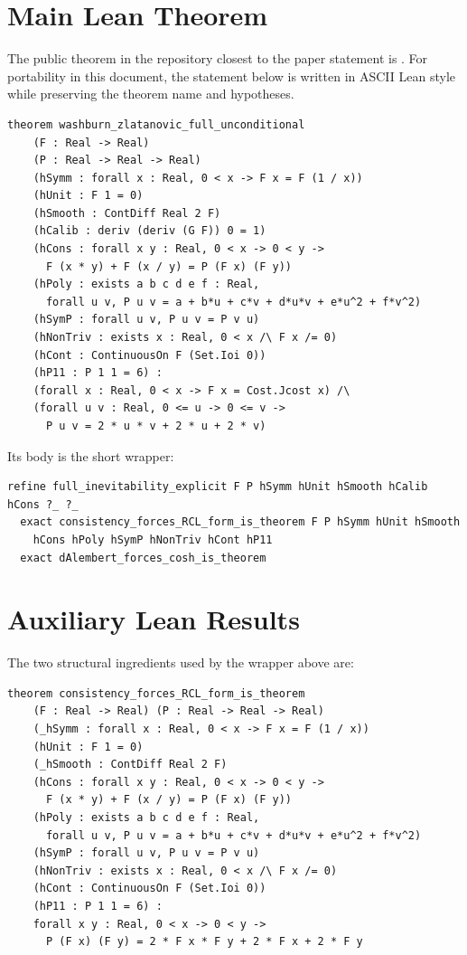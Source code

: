\documentclass[11pt]{article}
\theoremstyle{plain}
\begin{document}
\section*{Main Lean Theorem}
The public theorem in the repository closest to the paper statement is
. For portability in this
document, the statement below is written in ASCII Lean style while preserving
the theorem name and hypotheses.

\begin{lstlisting}[style=lean]
theorem washburn_zlatanovic_full_unconditional
    (F : Real -> Real)
    (P : Real -> Real -> Real)
    (hSymm : forall x : Real, 0 < x -> F x = F (1 / x))
    (hUnit : F 1 = 0)
    (hSmooth : ContDiff Real 2 F)
    (hCalib : deriv (deriv (G F)) 0 = 1)
    (hCons : forall x y : Real, 0 < x -> 0 < y ->
      F (x * y) + F (x / y) = P (F x) (F y))
    (hPoly : exists a b c d e f : Real,
      forall u v, P u v = a + b*u + c*v + d*u*v + e*u^2 + f*v^2)
    (hSymP : forall u v, P u v = P v u)
    (hNonTriv : exists x : Real, 0 < x /\ F x /= 0)
    (hCont : ContinuousOn F (Set.Ioi 0))
    (hP11 : P 1 1 = 6) :
    (forall x : Real, 0 < x -> F x = Cost.Jcost x) /\
    (forall u v : Real, 0 <= u -> 0 <= v ->
      P u v = 2 * u * v + 2 * u + 2 * v)
\end{lstlisting}

Its body is the short wrapper:

\begin{lstlisting}[style=lean]
refine full_inevitability_explicit F P hSymm hUnit hSmooth hCalib hCons ?_ ?_
  exact consistency_forces_RCL_form_is_theorem F P hSymm hUnit hSmooth
    hCons hPoly hSymP hNonTriv hCont hP11
  exact dAlembert_forces_cosh_is_theorem
\end{lstlisting}

\section*{Auxiliary Lean Results}
The two structural ingredients used by the wrapper above are:

\begin{lstlisting}[style=lean]
theorem consistency_forces_RCL_form_is_theorem
    (F : Real -> Real) (P : Real -> Real -> Real)
    (_hSymm : forall x : Real, 0 < x -> F x = F (1 / x))
    (hUnit : F 1 = 0)
    (_hSmooth : ContDiff Real 2 F)
    (hCons : forall x y : Real, 0 < x -> 0 < y ->
      F (x * y) + F (x / y) = P (F x) (F y))
    (hPoly : exists a b c d e f : Real,
      forall u v, P u v = a + b*u + c*v + d*u*v + e*u^2 + f*v^2)
    (hSymP : forall u v, P u v = P v u)
    (hNonTriv : exists x : Real, 0 < x /\ F x /= 0)
    (hCont : ContinuousOn F (Set.Ioi 0))
    (hP11 : P 1 1 = 6) :
    forall x y : Real, 0 < x -> 0 < y ->
      P (F x) (F y) = 2 * F x * F y + 2 * F x + 2 * F y
\end{lstlisting}
\end{document}
